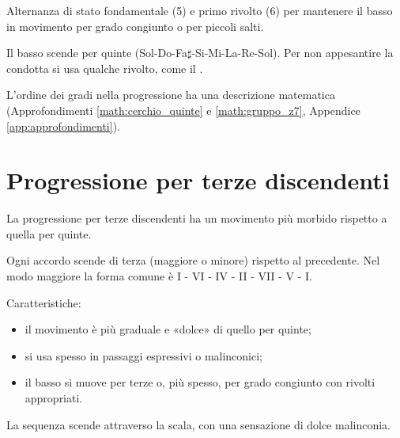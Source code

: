 \begin{esempio}
	\label{ex:progressione_quinte_disc}
	Alternanza di stato fondamentale (5) e primo rivolto (6) per mantenere il basso in movimento per grado congiunto o per piccoli salti.
\end{esempio}

\begin{esempio}
	\label{ex:progressione_5_sol}
	Il basso scende per quinte (Sol-Do-Fa$\sharp$-Si-Mi-La-Re-Sol). Per non appesantire la condotta si usa qualche rivolto, come il .
\end{esempio}

L'ordine dei gradi nella progressione ha una descrizione matematica (Approfondimenti \ref{math:cerchio_quinte} e \ref{math:gruppo_z7}, Appendice \ref{app:approfondimenti}).

\section{Progressione per terze discendenti}
\label{subsec:progressione_terze_disc}

La progressione per terze discendenti ha un movimento più morbido rispetto a quella per quinte.

\begin{regola}
	\label{reg:progressione_terze_disc}
	Ogni accordo scende di terza (maggiore o minore) rispetto al precedente. Nel modo maggiore la forma comune è
	I - VI - IV - II - VII - V - I.

	Caratteristiche:
	\begin{itemize}
		\item il movimento è più graduale e «dolce» di quello per quinte;
		\item si usa spesso in passaggi espressivi o malinconici;
		\item il basso si muove per terze o, più spesso, per grado congiunto con rivolti appropriati.
	\end{itemize}
\end{regola}

\begin{esempio}
	\label{ex:progressione_terze_disc}
	La sequenza scende attraverso la scala, con una sensazione di dolce malinconia.
\end{esempio}
